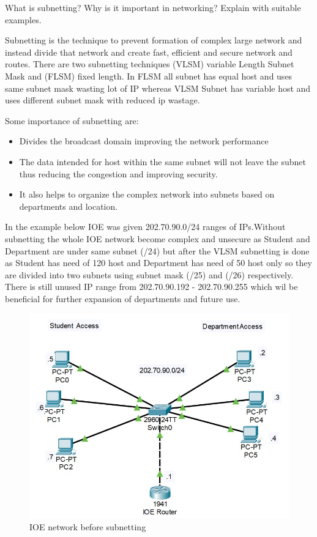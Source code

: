 \documentclass[a4paper,11pt]{article}
\begin{document}
\begin{Q}
    {
        What is subnetting? Why is it important in networking? Explain with suitable examples.
    }
\end{Q}
\begin{A}
    {
        Subnetting is the technique to prevent formation of complex large network and instead divide that network and create fast, efficient and secure network and routes.
        There are two subnetting techniques  (VLSM) variable Length Subnet Mask and (FLSM) fixed length. In FLSM all subnet has equal host and uses same subnet mask wasting lot of IP whereas  VLSM  Subnet has variable host and uses different subnet mask with reduced ip wastage.

        Some importance of subnetting are:
        \begin{itemize}
            \item Divides the broadcast domain improving the network performance
            \item The data intended for host within the same subnet will not leave the subnet thus reducing the congestion and improving security.
            \item It also helps to organize the complex network into subnets based on departments and location.
        \end{itemize}
        In the example below IOE was given 202.70.90.0/24  ranges of IPs.Without subnetting the whole IOE network become complex and unsecure as  Student and Department are under same subnet (/24) but after the VLSM subnetting is done  as Student has need of 120 host and Department has need of 50 host only so they are divided into two subnets using subnet mask (/25) and (/26) respectively.  There is still unused IP range from 202.70.90.192 - 202.70.90.255 which wil be beneficial for further expansion of departments and future use.

        \begin{figure}[H]
            \centering
            \includegraphics[scale=0.85,cframe=blue 0.5pt 3pt]{./IOEB.jpg}
            \caption{IOE network before subnetting}
        \end{figure}

}
\end{A}
\end{document}
